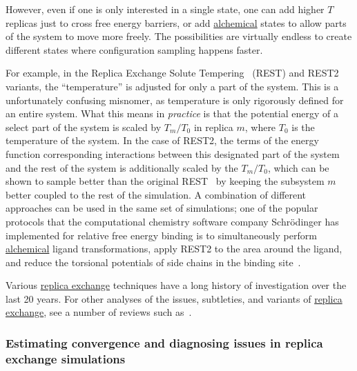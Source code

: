 \documentclass[9pt,review]{livecoms}
\begin{document}
However, even if one is only interested in a single state, one can add higher $T$ replicas just to cross free energy barriers, or add \hyperlink{ref:Alchemical} {alchemical} states to allow parts of the system to move more freely. The possibilities are virtually endless to create different states where configuration sampling happens faster.

For example, in the Replica Exchange Solute Tempering~\cite{REST1_Liu_2007} (REST) and REST2~\cite{REST2_Wang_2011} variants, the ``temperature'' is adjusted for only a part of the system. This is a unfortunately confusing misnomer, as temperature is only rigorously defined for an entire system. What this means in \textit{practice} is that the potential energy of a select part of the system is scaled by  $T_m/T_0$ in replica $m$, where $T_0$ is the temperature of the system. In the case of REST2, the terms of the energy function corresponding interactions between this designated part of the system and the rest of the system is additionally scaled by the $T_m/T_0$, which can be shown to sample better than the original REST~\citep{REST2_Wang_2011} by keeping the subsystem $m$ better coupled to the rest of the simulation. A combination of different approaches can be used in the same set of simulations; one of the popular protocols that the computational chemistry software company Schr\"{o}dinger has implemented for relative free energy binding is to simultaneously perform \hyperlink{ref:Alchemical} {alchemical} ligand transformations, apply REST2 to the area around the ligand, and reduce the torsional potentials of side chains in the binding site~\cite{Wang:JCTC:2013}.


Various \hyperlink{ref:ReplEx} {replica exchange} techniques have a long history of investigation over the last 20 years. For other analyses of the issues, subtleties, and variants of \hyperlink{ref:ReplEx} {replica exchange}, see a number of reviews such as~\cite{Abrams:E:2014,Gallicchio:CPC:2015,Itoh:JCTC:2013,kofke:2002:jcp:acceptance-probability,Liu:CPL:2018,nadler-hansmann:pre:2007:optimized-replica-exchange-moves,Qi:PSMaP:2018,shenfeld-xu:pre:2009:thermodynamic-length,sindhikara-emerson-roitberg:jctc:2010:exchange-often-and-properly}.

\subsubsection{Estimating convergence and diagnosing issues in replica exchange simulations}
\end{document}

